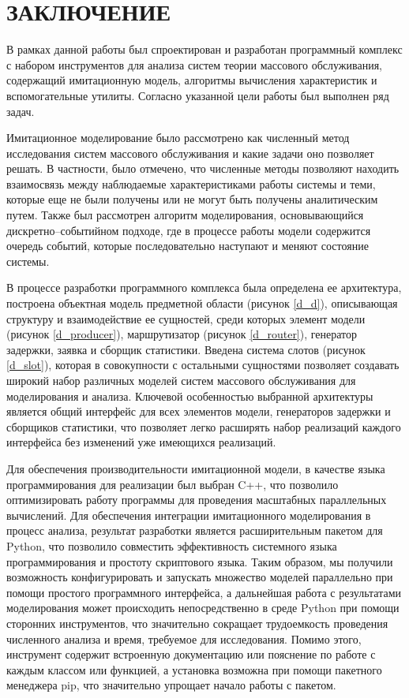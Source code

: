 \section*{\centering\normalsize ЗАКЛЮЧЕНИЕ}

В рамках данной работы был спроектирован и разработан программный комплекс с набором инструментов для анализа систем теории массового обслуживания, содержащий имитационную модель, алгоритмы вычисления характеристик и вспомогательные утилиты. Согласно указанной цели работы был выполнен ряд задач.

Имитационное моделирование было рассмотрено как численный метод исследования систем массового обслуживания и какие задачи оно позволяет решать. В частности, было отмечено, что численные методы позволяют находить взаимосвязь между наблюдаемые характеристиками работы системы и теми, которые еще не были получены или не могут быть получены аналитическим путем. Также был рассмотрен алгоритм моделирования, основывающийся дискретно--событийном подходе, где в процессе работы модели содержится очередь событий, которые последовательно наступают и меняют состояние системы. 

В процессе разработки программного комплекса была определена ее архитектура, построена объектная модель предметной области (рисунок  \ref{d_d}), описывающая структуру и взаимодействие ее сущностей, среди которых элемент модели (рисунок \ref{d_producer}), маршрутизатор (рисунок \ref{d_router}), генератор задержки, заявка и сборщик статистики. Введена система слотов (рисунок \ref{d_slot}), которая в совокупности с остальными сущностями позволяет создавать широкий набор различных моделей систем массового обслуживания для моделирования и анализа. Ключевой особенностью выбранной архитектуры является общий интерфейс для всех элементов модели, генераторов задержки и сборщиков статистики, что позволяет легко расширять набор реализаций каждого интерфейса без изменений уже имеющихся реализаций.

Для обеспечения производительности имитационной модели, в качестве языка программирования для реализации был выбран C++, что позволило оптимизировать работу программы для проведения масштабных параллельных вычислений. Для обеспечения интеграции имитационного моделирования в процесс анализа, результат разработки является расширительным пакетом для Python, что позволило совместить эффективность системного языка программирования и простоту скриптового языка. Таким образом, мы получили возможность конфигурировать и запускать множество моделей параллельно при помощи простого программного интерфейса, а дальнейшая работа с результатами моделирования может происходить непосредственно в среде Python при помощи сторонних инструментов, что значительно сокращает трудоемкость проведения численного анализа и время, требуемое для исследования. Помимо этого, инструмент содержит встроенную документацию или пояснение по работе с каждым классом или функцией, а установка возможна при помощи пакетного менеджера pip, что значительно упрощает начало работы с пакетом.


